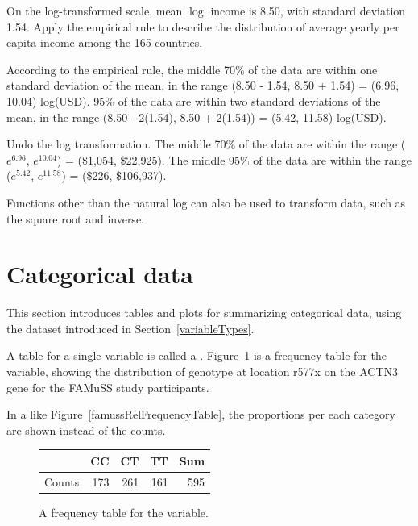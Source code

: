 \begin{examplewrap}
\begin{nexample}{On the log-transformed scale, mean $\log$ income is 8.50, with standard deviation 1.54. Apply the empirical rule to describe the distribution of average yearly per capita income among the 165 countries.}

According to the empirical rule, the middle 70\% of the data are within one standard deviation of the mean, in the range (8.50 - 1.54, 8.50 + 1.54) = (6.96, 10.04) log(USD). 95\% of the data are within two standard deviations of the mean, in the range (8.50 - 2(1.54), 8.50 + 2(1.54)) = (5.42, 11.58) log(USD). 	

Undo the log transformation. The middle 70\% of the data are within the range ($e^{6.96}$, $e^{10.04}$) = (\$1,054, \$22,925). The middle 95\% of the data are within the range ($e^{5.42}$, $e^{11.58}$) = (\$226, \$106,937).	
\end{nexample}
\end{examplewrap}

Functions other than the natural log can also be used to transform data, such as the square root and inverse.  


\section[Categorical data]{Categorical data}
\label{categoricalData}


This section introduces tables and plots for summarizing categorical data, using the  dataset introduced in Section~\ref{variableTypes}. 

A table for a single variable is called a . Figure~\ref{famussFrequencyTable} is a frequency table for the  variable, showing the distribution of genotype at location r577x on the ACTN3 gene for the FAMuSS study participants.

In a  like Figure~\ref{famussRelFrequencyTable}, the proportions per each category are shown instead of the counts.

\begin{figure}[ht]
	\centering
	\begin{tabular}{rrrrr}
		\hline
		& CC & CT & TT & Sum \\ 
		\hline
		Counts & 173 & 261 & 161 & 595 \\ 
		\hline
	\end{tabular}
	\caption{A frequency table for the  variable.} 
	\label{famussFrequencyTable}
\end{figure}


